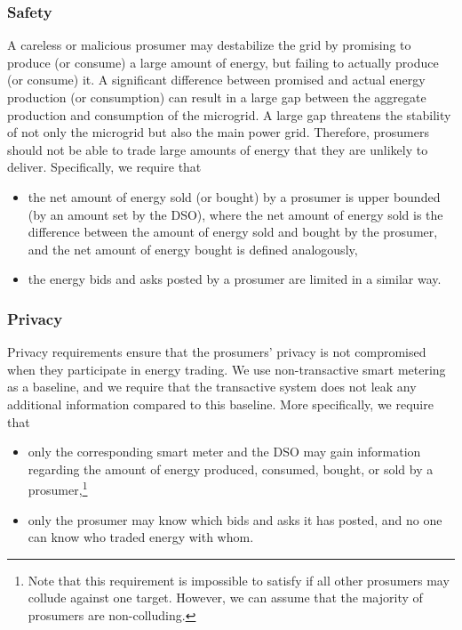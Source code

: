 \subsubsection{Safety}
A careless or malicious prosumer may destabilize the grid by promising
to produce (or consume) a large amount of energy, but failing to actually
produce (or consume) it.  A significant difference between promised and
actual energy production (or consumption) can result in a large gap
between the aggregate production and consumption of the microgrid.
A large gap threatens the stability of not only the microgrid but also the main
power grid.  Therefore, prosumers should not be able to trade large
amounts of energy that they are unlikely to deliver.
Specifically, we require that 
\begin{itemize}[noitemsep,topsep=-\parskip]
\item the net amount of energy sold (or bought) by a prosumer is upper
  bounded (by an amount set by the DSO), where the net amount of
  energy sold is the difference between the amount of energy sold and
  bought by the prosumer, and the net amount of energy bought is
  defined analogously,
\item the energy bids and asks posted by a prosumer are limited in a
  similar way.
\end{itemize}

\subsubsection{Privacy} 
Privacy requirements ensure that the prosumers' privacy is not
compromised when they participate in energy trading.  We use
non-transactive smart metering as a baseline, and we require that
the transactive system does not leak any additional information
compared to this baseline.  More specifically, we require that
\begin{itemize}[noitemsep,topsep=-\parskip]
\item only the corresponding smart meter and the DSO may gain
  information regarding the amount of energy produced, consumed,
  bought, or sold by a prosumer,\footnote{Note that this requirement
    is impossible to satisfy if all other prosumers may collude
    against one target. However, we can assume that the majority of
    prosumers are non-colluding.}
\item only the prosumer may know which bids and asks it has posted,
  and no one can know who traded energy with whom.
\end{itemize}


